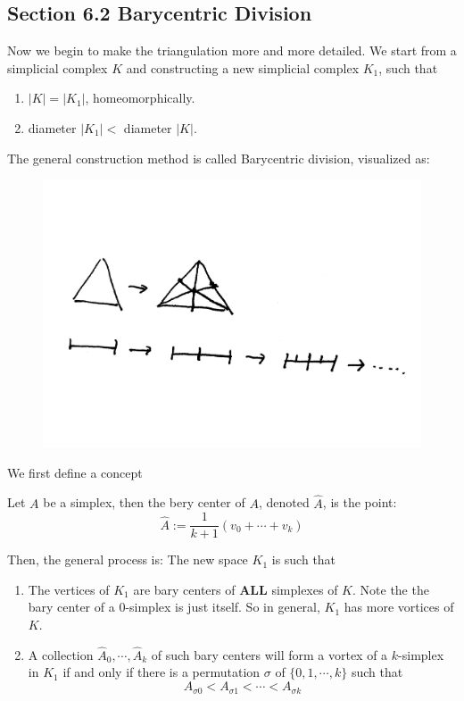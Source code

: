 \subsection{Section 6.2 Barycentric Division}
\label{sec:Barycentric-Division}
Now we begin to make the triangulation more and more detailed. We
start from a simplicial complex $K$ and constructing a new simplicial
complex $K_1$, such that
\begin{enumerate}
    \item $|K|=|K_1|$, homeomorphically.
    \item diameter $|K_1|<$ diameter $|K|$.
\end{enumerate}
The general construction method is called Barycentric division,
visualized as:
\begin{figure}[H]
    \centering
    \includegraphics[width=0.6\linewidth]{pics/ch6-scanned-notes-1/8.pdf}
\end{figure}
We first define a concept
\begin{defi}
Let $A$ be a simplex, then the bery center of $A$, denoted $\hat{A}$,
is the point:
\begin{equation}
    \hat{A}:= \frac{1}{k+1}(v_0+\cdots+v_k)
\end{equation}
\end{defi}
Then, the general process is:
The new space $K_1$ is such that
\begin{enumerate}
    \item The vertices of $K_1$ are bary centers of \textbf{ALL}
        simplexes of $K$. Note the the bary center of a $0$-simplex
        is just itself. So in general, $K_1$ has more vortices of
        $K$.
    \item A collection $\hat{A}_0,\cdots,\hat{A}_k$ of such bary
        centers will form a vortex of a $k$-simplex in $K_1$ if and
        only if there is a permutation $\sigma$ of $\{0,1,\cdots,k\}$
        such that
        \begin{equation}
            A_{\sigma{0}}< A_{\sigma{1}} < \cdots < A_{\sigma{k}}
        \end{equation}
\end{enumerate}
